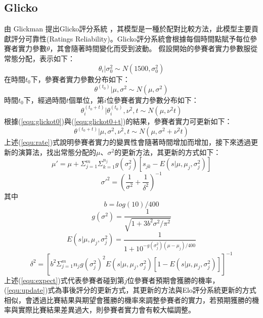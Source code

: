 \documentclass[12pt]{article}
\begin{document}
\subsection{Glicko}
由 Glickman 提出Glicko評分系統 \cite{alma991021119382005721}，其模型是一種於配對比較方法，此模型主要貢獻評分可靠性(Ratings Reliability)。Glicko評分系統會根據每個時間點賦予每位參賽者實力參數$\theta$，其會隨著時間變化而受到波動。
假設開始的參賽者實力參數服從常態分配，表示如下：
\begin{equation}
\theta_i|\sigma^2_0 \sim N(1500,\sigma^2_0)
\end{equation}
在時間$t_0$下，參賽者實力參數分布如下：
\begin{equation}
\theta^{(t_0)}|\mu,\sigma^2 \sim N(\mu,\sigma^2)
\label{equ:glickot0}
\end{equation}
時間$t_0$下，經過時間$t$個單位，第$i$位參賽者實力參數分布如下：
\begin{equation}
\theta^{(t_0+t)}_i|\theta^{(t_0)}_i,\nu^2,t \sim N(\mu,\nu^2t)
\label{equ:glickot0+t}
\end{equation}
根據(\ref{equ:glickot0})與(\ref{equ:glickot0+t})的結果，參賽者實力可更新如下：
\begin{equation}
\theta^{(t_0+t)}|\mu,\sigma^2,\nu^2,t \sim N(\mu,\sigma^2 + \nu^2 t)
\label{equ:rate}
\end{equation}
上述(\ref{equ:rate})式說明參賽者實力的變異性會隨著時間增加而增加，接下來透過更新的演算法，找出常態分配的$\mu$、$\sigma^2$的更新方法，其更新的方式如下：
\begin{equation}
\mu' = \mu + \Sigma_{j=1}^m \Sigma_{k=1}^{n_j}{g(\sigma^2_j)[s_{jk}-E(s|\mu,\mu_j,\sigma^2_j)]}
\label{equ:update}
\end{equation}
\begin{equation}
\sigma'^2 = (\dfrac{1}{\sigma^2} + \dfrac{1}{\delta^2})^{-1}
\end{equation}
其中
\[
b = log(10)/400
\]
\[
g(\sigma^2) = \dfrac{1}{\sqrt{1+3b^2\sigma^2/\pi^2}}
\]
\begin{equation}
E(s|\mu,\mu_j,\sigma^2_j) = \dfrac{1}{1+10^{-g(\sigma^2_j)(\mu-\mu_j)/400}}
\label{equ:expect}
\end{equation}
\[
\delta^2 = [b^2 \Sigma_{j=1}^m{n_jg(\sigma^2_j)^2E(s|\mu,\mu_j,\sigma^2_j)[1-E(s|\mu,\mu_j,\sigma^2_j)]}]^{-1}
\]
上述(\ref{equ:expect})式代表參賽者碰到第$j$位參賽者預期會獲勝的機率，(\ref{equ:update})式為事後評分的更新方式，其更新的方法與Elo評分系統更新的方式相似，會透過比賽結果與期望會獲勝的機率來調整參賽者的實力，若預期獲勝的機率與實際比賽結果差異過大，則參賽者實力會有較大幅調整。
\end{document}
